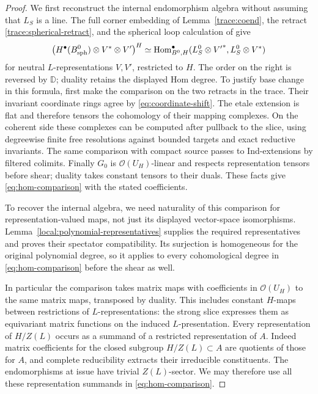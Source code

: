 \documentclass[11pt]{article}
\numberwithin{equation}{section}
\theoremstyle{definition}
\theoremstyle{remark}
\newcommand{\cO}{\mathcal O}
\newcommand{\Hom}{\operatorname{Hom}}
\begin{document}
\begin{proof}
We first reconstruct the internal endomorphism algebra without
assuming that $L_S$ is a line.  The full corner embedding of
Lemma~\ref{trace:coend}, the retract
\eqref{trace:spherical-retract}, and the spherical loop calculation
of \cite[Proposition~2.7, ``Spectral form of a Frobenius trace'']{Parent}
give
\begin{equation}\label{eq:hom-comparison}
 \bigl(H^\bullet(B_{\rm sph}^0)\otimes V^*\otimes V'\bigr)^H
 \simeq
 \Hom^\bullet_{B^0,H}
       (L_S^0\otimes {V'}^*,L_S^0\otimes V^*)
\end{equation}
for neutral $L$-representations $V,V'$, restricted to $H$.  The order
on the right is reversed by $\mathbb D$; duality retains the displayed
Hom degree.  To justify base change in this formula, first make the
comparison on the two retracts in the trace.  Their invariant
coordinate rings agree by \eqref{eq:coordinate-shift}.  The etale
extension is flat and therefore tensors the cohomology of their
mapping complexes.  On the coherent side these complexes can be
computed after pullback to the slice, using degreewise finite free
resolutions against bounded targets and exact reductive
invariants.  The same comparison with compact source passes to
Ind-extensions by filtered colimits.  Finally $G_0$ is
$\cO(U_H)$-linear and respects representation tensors before shear;
duality takes constant tensors to their duals.  These facts give
\eqref{eq:hom-comparison} with the stated coefficients.

To recover the internal algebra, we need naturality of this
comparison for representation-valued maps, not just its displayed
vector-space isomorphisms.  Lemma~\ref{local:polynomial-representatives}
supplies the required representatives and proves their spectator
compatibility.  Its surjection is homogeneous for the original
polynomial degree, so it applies to every cohomological degree in
\eqref{eq:hom-comparison} before the shear as well.

In particular the comparison takes matrix maps with coefficients in
$\cO(U_H)$ to the same matrix maps, transposed by duality.  This
includes constant $H$-maps between restrictions of $L$-representations:
the strong slice expresses them as equivariant matrix functions on
the induced $L$-presentation.  Every representation of $H/Z(L)$
occurs as a summand of a restricted representation of $A$.  Indeed
matrix coefficients for the closed subgroup $H/Z(L)\subset A$ are
quotients of those for $A$, and complete reducibility extracts their
irreducible constituents.  The endomorphisms at issue have trivial
$Z(L)$-sector.  We may therefore use all these representation
summands in \eqref{eq:hom-comparison}.


\end{proof}
\end{document}
